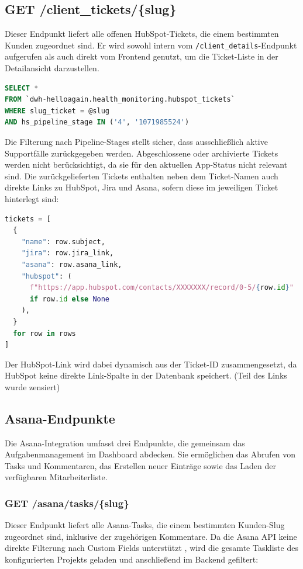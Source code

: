 \subsection{GET /client\_tickets/\{slug\}}
Dieser Endpunkt liefert alle offenen HubSpot-Tickets, die einem bestimmten Kunden zugeordnet sind. Er wird sowohl intern vom \texttt{/client\_details}-Endpunkt aufgerufen als auch direkt vom Frontend genutzt, um die Ticket-Liste in der Detailansicht darzustellen.

\begin{lstlisting}[language=SQL, caption={BigQuery-Abfrage für Kunden-Tickets}, label={lst:tickets-query}]
SELECT *
FROM `dwh-helloagain.health_monitoring.hubspot_tickets`
WHERE slug_ticket = @slug
AND hs_pipeline_stage IN ('4', '1071985524')
\end{lstlisting}

Die Filterung nach Pipeline-Stages stellt sicher, dass ausschließlich aktive Supportfälle zurückgegeben werden. Abgeschlossene oder archivierte Tickets werden nicht berücksichtigt, da sie für den aktuellen App-Status nicht relevant sind. Die zurückgelieferten Tickets enthalten neben dem Ticket-Namen auch direkte Links zu HubSpot, Jira und Asana, sofern diese im jeweiligen Ticket hinterlegt sind:

\begin{lstlisting}[language=Python, caption={Aufbereitung der Ticket-Daten}, label={lst:ticket-processing}]
tickets = [
  {
    "name": row.subject,
    "jira": row.jira_link,
    "asana": row.asana_link,
    "hubspot": (
      f"https://app.hubspot.com/contacts/XXXXXXX/record/0-5/{row.id}"
      if row.id else None
    ),
  }
  for row in rows
]
\end{lstlisting}

Der HubSpot-Link wird dabei dynamisch aus der Ticket-ID zusammengesetzt, da HubSpot keine direkte Link-Spalte in der Datenbank speichert. (Teil des Links wurde zensiert)

\subsection{Asana-Endpunkte}
Die Asana-Integration umfasst drei Endpunkte, die gemeinsam das Aufgabenmanagement im Dashboard abdecken. Sie ermöglichen das Abrufen von Tasks und Kommentaren, das Erstellen neuer Einträge sowie das Laden der verfügbaren Mitarbeiterliste.

\subsubsection{GET /asana/tasks/\{slug\}}
Dieser Endpunkt liefert alle Asana-Tasks, die einem bestimmten Kunden-Slug zugeordnet sind, inklusive der zugehörigen Kommentare. Da die Asana API keine direkte Filterung nach Custom Fields unterstützt \cite{asana_filtering}, wird die gesamte Taskliste des konfigurierten Projekts geladen und anschließend im Backend gefiltert:

